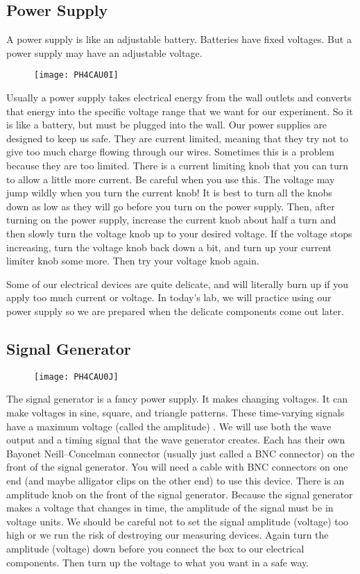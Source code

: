 \subsection{Power Supply}
\label{power}
A power supply is like an adjustable battery. Batteries have fixed voltages.
But a power supply may have an adjustable voltage. \begin{figure}[h!]
\texttt{[image: PH4CAU0I]}
\end{figure}Usually a power supply takes
electrical energy from the wall outlets and converts that energy into the
specific voltage range that we want for our experiment. So it is like a
battery, but must be plugged into the wall. Our power supplies are designed
to keep us safe. They are current limited, meaning that they try not to give
too much charge flowing through our wires. Sometimes this is a problem
because they are too limited. There is a current limiting knob that you can
turn to allow a little more current. Be careful when you use this. The
voltage may jump wildly when you turn the current knob! It is best to turn
all the knobs down as low as they will go before you turn on the power
supply. Then, after turning on the power supply, increase the current knob
about half a turn and then slowly turn the voltage knob up to your desired
voltage. If the voltage stops increasing, turn the voltage knob back down a
bit, and turn up your current limiter knob some more. Then try your voltage
knob again.

Some of our electrical devices are quite delicate, and will literally burn
up if you apply too much current or voltage. In today's lab, we will
practice using our power supply so we are prepared when the delicate
components come out later.

\subsection{Signal Generator}
\label{siggen}
\begin{figure}[h!]
\texttt{[image: PH4CAU0J]}
\end{figure}The signal generator is a fancy
power supply. It makes changing voltages. It can make voltages in sine,
square, and triangle patterns. These time-varying signals have a maximum
voltage (called the amplitude) . We will use both the wave output and a
timing signal that the wave generator creates. Each has their own Bayonet
Neill--Concelman connector (usually just called a BNC connector) on the
front of the signal generator. You will need a cable with BNC connectors on
one end (and maybe alligator clips on the other end) to use this device.
There is an amplitude knob on the front of the signal generator. Because the
signal generator makes a voltage that changes in time, the amplitude of the
signal must be in voltage units. We should be careful not to set the signal
amplitude (voltage) too high or we run the risk of destroying our measuring
devices. Again turn the amplitude (voltage) down before you connect the box
to our electrical components. Then turn up the voltage to what you want in a
safe way.

